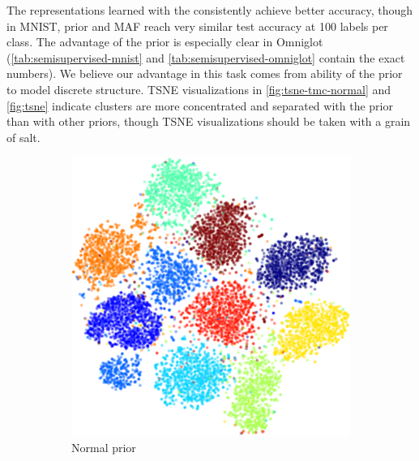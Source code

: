 The representations
learned with the \acronym\;
consistently achieve better accuracy,
though  in MNIST, \acronym\;prior
and MAF reach very similar test
accuracy at 100 labels per class.
The advantage of the \acronym\;prior is especially clear
in Omniglot
(\autoref{tab:semisupervised-mnist}
and \autoref{tab:semisupervised-omniglot} contain the exact numbers).
We believe our advantage in this task
comes from ability of the \acronym\;prior
to model discrete structure.
TSNE visualizations
in \autoref{fig:tsne-tmc-normal} and \autoref{fig:tsne}
indicate
clusters are more concentrated and separated
with the \acronym\;prior
than with other priors,
though TSNE visualizations should be
taken with a grain of salt.

\begin{figure}[H]
\centering
\begin{subfigure}[t]{0.4\textwidth}
    \centering
    \includegraphics[width=\textwidth]{img/loracs/mnist/tsne/mnist2-tsne-normal.png}
    \caption{Normal prior}
\end{subfigure}
\begin{subfigure}[t]{0.4\textwidth}
    \centering

\end{subfigure}
\end{figure}
